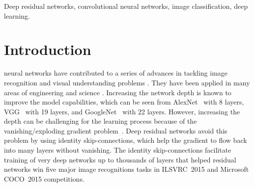 \documentclass[journal]{IEEEtran}
\begin{document}
\begin{IEEEkeywords}
Deep residual networks, convolutional neural networks, image classification, deep learning.
\end{IEEEkeywords}






%
\IEEEpeerreviewmaketitle



\section{Introduction}
% 
% 
% 
% 
  neural networks \cite{lecun1989backpropagation} have contributed to a series of advances in tackling image recognition and visual understanding problems \cite{krizhevsky2012imagenet,sermanet2013overfeat,zeiler2014visualizing}. They have been applied in many areas of engineering and science \cite{wallach2015atomnet,mohan2014deep,kim2014convolutional}. Increasing the network depth is known to improve the model capabilities, which can be seen from AlexNet~\cite{krizhevsky2012imagenet} with 8 layers, VGG~\cite{simonyan2014very} with 19 layers, and GoogleNet~\cite{szegedy2015going} with 22 layers. However, increasing the depth can be challenging for the learning process because of the vanishing/exploding gradient problem~\cite{hochreiter1991untersuchungen,bengio1994learning}. Deep residual networks \cite{he2015deep} avoid this problem by using identity skip-connections, which help the gradient to flow back into many layers without vanishing. The identity skip-connections facilitate training of very deep networks up to thousands of layers that helped residual networks win five major image recognitions tasks in ILSVRC~2015 \cite{ILSVRC15} and Microsoft COCO~2015 \cite{lin2014microsoft} competitions.
\end{document}
